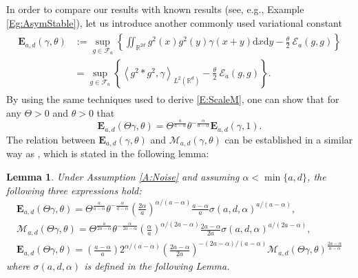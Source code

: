 \documentclass[a4paper,11pt]{article}
\numberwithin{equation}{section}
\numberwithin{equation}{section}
\theoremstyle{plain}
\newtheorem{lemma}[theorem]{Lemma}
\theoremstyle{definition}
\newcommand{\ud}{\ensuremath{\mathrm{d} }}
\newcommand{\R}{\mathbb{R}}
\begin{document}
In order to compare our results with known results (see, e.g., Example \ref{Eg:AsymStable}), let us
introduce another commonly used variational constant
\begin{align} \label{E:VarConstE}
  \begin{aligned}
    \mathbf{E}_{a,d}(\gamma,\theta)
    & := \sup_{g \in \mathcal{F}_a} \left\{ \iint_{\R^{2d}} g^2(x)g^2(y) \gamma(x+y)\ud x\ud y - \frac{\theta}{2}\: \mathcal{E}_a(g,g) \right\} \\
    & = \sup_{g \in \mathcal{F}_a} \left\{ \left\langle g^2 * g^2, \gamma \right\rangle_{L^2(\R^d)} - \frac{\theta}{2}\: \mathcal{E}_a(g,g) \right\}.
  \end{aligned}
\end{align}
By using the same techniques used to derive \eqref{E:ScaleM}, one can show that for any $\Theta >0$
and $\theta>0$ that
\begin{equation}\label{E:ScaleE}
      \mathbf{E}_{a,d}(\Theta\gamma,\theta)
    = \Theta^{\frac{a}{a-\alpha}} \theta^{-\frac{\alpha}{a-\alpha}}  \mathbf{E}_{a,d}(\gamma,1).
\end{equation}
The relation between $\mathbf{E}_{a,d}(\gamma,\theta)$ and $\mathcal{M}_{a,d}(\gamma,\theta)$ can be
established in a similar way as \cite[Lemma A.2]{15AIHP}, which is stated in the following lemma:

\begin{lemma} \label{L:EvsM}
  Under Assumption \ref{A:Noise} and assuming $\alpha <\min\{a,d\}$, the following three expressions hold:
  \begin{gather} \label{E:Erelation}
    \mathbf{E}_{a,d}(\Theta\gamma,\theta)
    = \Theta^{\frac{a}{a-\alpha}} \theta^{-\frac{\alpha}{a-\alpha}}\left(\frac{2\alpha}{a}\right)^{\alpha/(a-\alpha)}\frac{a-\alpha}{a}\sigma(a, d,\alpha)^{a/(a-\alpha)},        \\
    \label{E:Mrelation}
    \mathcal{M}_{a,d}(\Theta\gamma,\theta)
    = \Theta^{\frac{a}{2a-\alpha}}\theta^{-\frac{\alpha}{2a-\alpha}} \left( \frac{\alpha}{a}\right)^{\alpha/(2a-\alpha)} \frac{2a-\alpha}{2a}\sigma(a, d,\alpha)^{a/(2a-\alpha)}, \\
    \label{E:EvsM}
    \mathbf{E}_{a,d}(\Theta\gamma,\theta)
    = \left( \frac{a-\alpha}{a}\right) 2^{\alpha/(a-\alpha)}\left( \frac{2a-\alpha}{2a} \right)^{-(2a-\alpha)/(a-\alpha)} \mathcal{M}_{a,d}(\Theta\gamma,\theta)^{\frac{2a-\alpha}{a-\alpha}}
  \end{gather}
where $\sigma(a, d,\alpha)$ is defined in the following Lemma.
\end{lemma}
\end{document}
